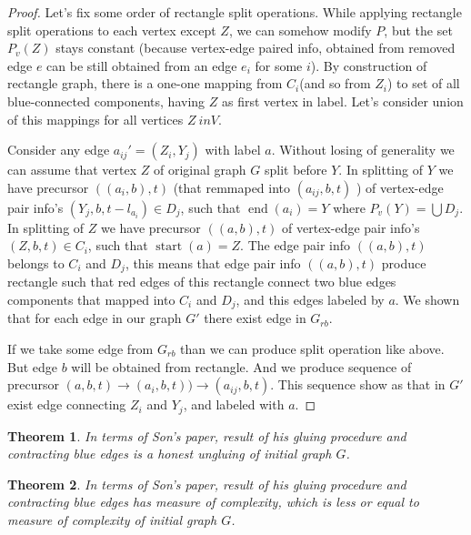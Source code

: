 \documentclass[12pt,a4paper,oneside]{article}
\newtheorem{theorem}{Theorem}
\begin{document}
\begin{proof}
Let's fix some order of rectangle split operations.
While applying rectangle split operations to each vertex except $Z$, we can somehow modify $P$, but the set $P_v(Z)$ stays constant (because vertex-edge paired info, obtained from removed edge $e$ can be still obtained from an edge $e_i$ for some $i$). By construction of rectangle graph, there is a one-one mapping from $C_i$(and so from $Z_i$) to set of all blue-connected components, having $Z$ as first vertex in label. Let's consider union of this mappings for all vertices $Z \ in V$. 

Consider any edge $a_{ij}'=(Z_i, Y_j)$ with label $a$. 
Without losing of generality we can assume that vertex $Z$ of original graph $G$ split before $Y$. In splitting of $Y$ we have precursor $((a_{i}, b), t)$ (that remmaped into $(a_{ij}, b, t)$ ) of vertex-edge pair info's $(Y_j, b, t-l_{a_i}) \in D_j$, such that $\mathop{end}(a_{i}) = Y$ where $P_v(Y) = \bigcup D_j$. In splitting of $Z$ we have precursor $((a, b), t)$ of vertex-edge pair info's $(Z, b, t) \in C_i$, such that $\mathop{start}(a) = Z$. The edge pair info $((a, b), t)$ belongs to $C_i$ and $D_j$, this means that edge pair info $((a, b), t)$ produce rectangle such that red edges of this rectangle connect two blue edges  components that mapped into $C_i$ and $D_j$, and this edges labeled by $a$. We shown that for each edge in our graph $G'$ there exist edge in $G_{rb}$.

If we take some edge from $G_{rb}$ than we can produce split operation like above. But edge $b$ will be obtained from rectangle. And we produce sequence of precursor $(a,b,t)\rightarrow (a_i,b,t))\rightarrow (a_{ij},b,t)$. This sequence show as that in $G'$ exist edge connecting $Z_i$ and $Y_j$, and labeled with $a$. 
\end{proof}



\begin{theorem}
  In terms of Son's paper, result of his gluing procedure and contracting blue edges is a honest ungluing of initial graph $G$. 
\end{theorem}
\begin{theorem}
  In terms of Son's paper, result of his gluing procedure and contracting blue edges has measure of complexity, which is less or equal to measure of complexity of initial graph $G$. 
\end{theorem}
\end{document}
